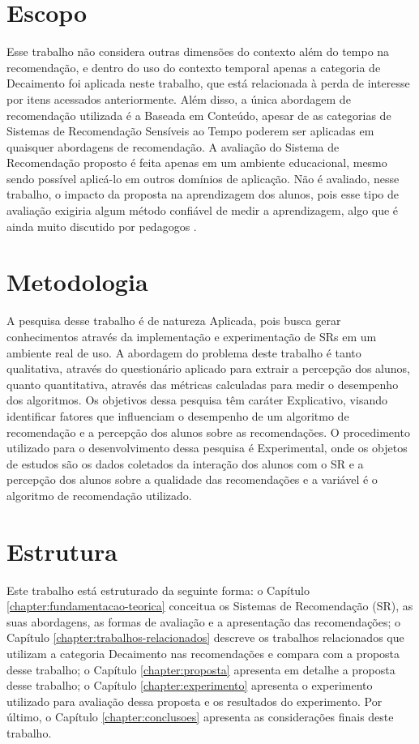\section{Escopo}

Esse trabalho não considera outras dimensões do contexto além do tempo na recomendação, e dentro do uso do contexto
temporal apenas a categoria de Decaimento foi aplicada neste trabalho, que está relacionada à perda de
interesse por itens acessados anteriormente. Além disso, a única abordagem de recomendação utilizada é a Baseada em
Conteúdo, apesar de as categorias de Sistemas de Recomendação Sensíveis ao Tempo poderem ser aplicadas em quaisquer
abordagens de recomendação. A avaliação do Sistema de Recomendação proposto é feita apenas em um ambiente educacional,
mesmo sendo possível aplicá-lo em outros domínios de aplicação. Não é avaliado, nesse trabalho, o impacto da proposta
na aprendizagem dos alunos, pois esse tipo de avaliação
exigiria algum método confiável de medir a aprendizagem, algo que é ainda muito discutido por pedagogos \cite{luckesi2014avaliaccao}.

\section{Metodologia}

A pesquisa desse trabalho é de natureza Aplicada, pois busca gerar conhecimentos através da implementação e experimentação
de SRs em um ambiente real de uso. A abordagem do problema deste trabalho é tanto qualitativa, através do questionário
aplicado para extrair a percepção dos alunos, quanto quantitativa, através das métricas calculadas para medir o desempenho
dos algoritmos. Os objetivos dessa pesquisa têm caráter Explicativo, visando identificar fatores que influenciam o
desempenho de um algoritmo de recomendação e a percepção dos alunos sobre as recomendações. O procedimento utilizado
para o desenvolvimento dessa pesquisa é Experimental, onde os objetos de estudos são os dados coletados da interação dos
alunos com o SR e a percepção dos alunos sobre a qualidade das recomendações e a variável é o algoritmo de recomendação
utilizado.

\section{Estrutura}

Este trabalho está estruturado da seguinte forma: o Capítulo \ref{chapter:fundamentacao-teorica} conceitua os Sistemas de
Recomendação (SR), as suas abordagens, as formas de avaliação e a apresentação das recomendações; o Capítulo \ref{chapter:trabalhos-relacionados}
descreve os trabalhos relacionados que utilizam a categoria Decaimento nas recomendações e compara com a proposta desse
trabalho; o Capítulo \ref{chapter:proposta} apresenta em detalhe a proposta desse trabalho; o Capítulo \ref{chapter:experimento}
apresenta o experimento utilizado para avaliação dessa proposta e os resultados do experimento. Por último, o Capítulo \ref{chapter:conclusoes} apresenta
as considerações finais deste trabalho.


